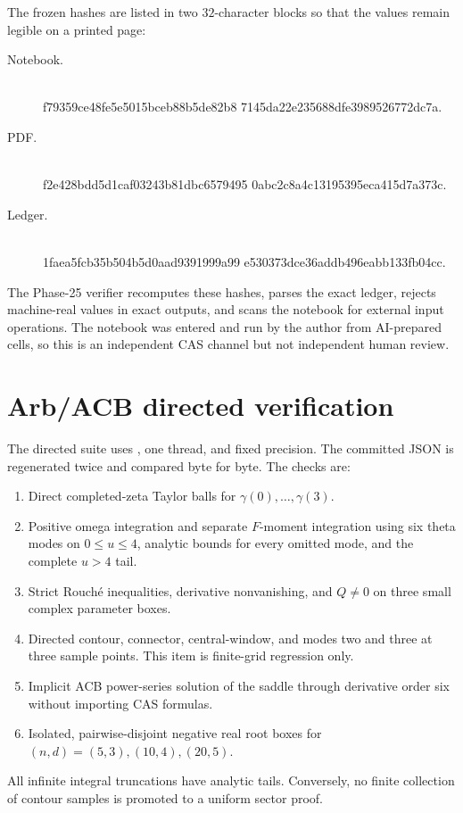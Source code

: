 \documentclass[10pt]{article}
\begin{document}
The frozen hashes are listed in two $32$-character blocks so that the values
remain legible on a printed page:
\begin{description}
\item[Notebook.] \\
{\scriptsize\ttfamily
f79359ce48fe5e5015bceb88b5de82b8\allowbreak
7145da22e235688dfe3989526772dc7a}.
\item[PDF.] \\
{\scriptsize\ttfamily
f2e428bdd5d1caf03243b81dbc6579495\allowbreak
0abc2c8a4c13195395eca415d7a373c}.
\item[Ledger.] \\
{\scriptsize\ttfamily
1faea5fcb35b504b5d0aad9391999a99\allowbreak
e530373dce36addb496eabb133fb04cc}.
\end{description}

The Phase-25 verifier recomputes these hashes, parses the exact ledger, rejects
machine-real values in exact outputs, and scans the notebook for external
input operations.  The notebook was entered and run by the author from
AI-prepared cells, so this is an independent CAS channel but not independent
human review.

\section{Arb/ACB directed verification}\label{sup:arb}

The directed suite uses , one thread, and fixed
precision.  The committed JSON is regenerated twice and compared byte for
byte.  The checks are:
\begin{enumerate}
\item Direct completed-zeta Taylor balls for $\gamma(0),\ldots,\gamma(3)$.
\item Positive omega integration and separate $F$-moment integration using
six theta modes on $0\le u\le4$, analytic bounds for every omitted mode, and
the complete $u>4$ tail.
\item Strict Rouch\'e inequalities, derivative nonvanishing, and $Q\ne0$ on
three small complex parameter boxes.
\item Directed contour, connector, central-window, and modes two and three at
three sample points.  This item is finite-grid regression only.
\item Implicit ACB power-series solution of the saddle through derivative
order six without importing CAS formulas.
\item Isolated, pairwise-disjoint negative real root boxes for
$(n,d)=(5,3),(10,4),(20,5)$.
\end{enumerate}
All infinite integral truncations have analytic tails.  Conversely, no
finite collection of contour samples is promoted to a uniform sector proof.
\end{document}
